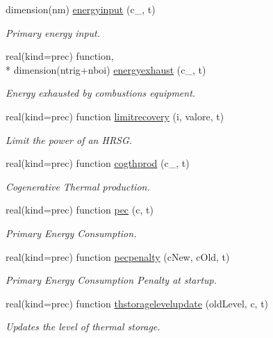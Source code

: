 \begin{DoxyCompactItemize}
dimension(nm) \hyperlink{classenergy_aebd116fdbb931db63a6450c7ba3197df}{energyinput} (c\-\_\-, t)
\begin{DoxyCompactList}\small\item\em Primary energy input. \end{DoxyCompactList}\item 
real(kind=prec) function, \\*
dimension(ntrig+nboi) \hyperlink{classenergy_aa9595768898cb233d53596e9ce19744f}{energyexhaust} (c\-\_\-, t)
\begin{DoxyCompactList}\small\item\em Energy exhausted by combustions equipment. \end{DoxyCompactList}\item 
real(kind=prec) function \hyperlink{classenergy_adee2b0ef7e3ae6a8da4a2357ffa14a28}{limitrecovery} (i, valore, t)
\begin{DoxyCompactList}\small\item\em Limit the power of an H\-R\-S\-G. \end{DoxyCompactList}\item 
real(kind=prec) function \hyperlink{classenergy_a6060381a3418f406c8ca108f9c5a7fd5}{cogthprod} (c\-\_\-, t)
\begin{DoxyCompactList}\small\item\em Cogenerative Thermal production. \end{DoxyCompactList}\item 
real(kind=prec) function \hyperlink{classenergy_a082e1efb7fb9b51f62cfe800fefe1585}{pec} (c, t)
\begin{DoxyCompactList}\small\item\em Primary Energy Consumption. \end{DoxyCompactList}\item 
real(kind=prec) function \hyperlink{classenergy_a85b1719a96ad6c8ccc87e720cb6b0397}{pecpenalty} (c\-New, c\-Old, t)
\begin{DoxyCompactList}\small\item\em Primary Energy Consumption Penalty at startup. \end{DoxyCompactList}\item 
real(kind=prec) function \hyperlink{classenergy_a59e350e8898c5358a92c3475d3cedb18}{thstoragelevelupdate} (old\-Level, c, t)
\begin{DoxyCompactList}\small\item\em Updates the level of thermal storage. \end{DoxyCompactList}\item 

\end{DoxyCompactItemize}
